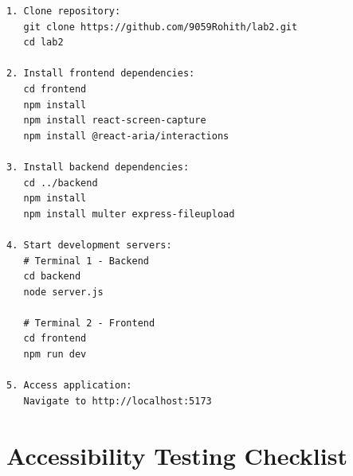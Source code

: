 \documentclass[12pt, a4paper]{article}
\begin{document}
\begin{verbatim}
1. Clone repository:
   git clone https://github.com/9059Rohith/lab2.git
   cd lab2

2. Install frontend dependencies:
   cd frontend
   npm install
   npm install react-screen-capture
   npm install @react-aria/interactions

3. Install backend dependencies:
   cd ../backend
   npm install
   npm install multer express-fileupload

4. Start development servers:
   # Terminal 1 - Backend
   cd backend
   node server.js

   # Terminal 2 - Frontend
   cd frontend
   npm run dev

5. Access application:
   Navigate to http://localhost:5173
\end{verbatim}

\section{Accessibility Testing Checklist}
\end{document}
